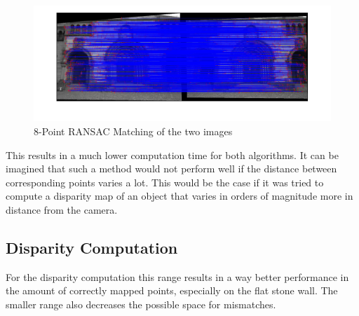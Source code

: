 \documentclass[12pt]{article}
\begin{document}
\begin{figure}[H]
	\centering
	\includegraphics[width=1.1\textwidth]{8pRansac}
	\caption{8-Point RANSAC Matching of the two images}
	\label{fig1}
\end{figure}


This results in a much lower computation time for both algorithms. It can be imagined that such a method would not perform well if the distance between corresponding points varies a lot. This would be the case if it was tried to compute a disparity map of an object that varies in orders of magnitude more in distance from the camera.

\subsection{Disparity Computation}

For the disparity computation this range results in a way better performance in the amount of correctly mapped points, especially on the flat stone wall. The smaller range also decreases the possible space for mismatches.   
\end{document}
